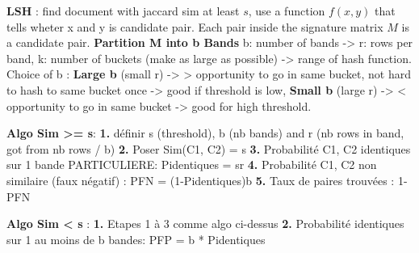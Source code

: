 \documentclass[9pt,a4paper]{report}
\begin{document}
\textbf{LSH} : find document with jaccard sim at least $s$, use a function $f(x,y)$ that tells wheter x and y is candidate pair. Each pair inside the signature matrix $M$ is a candidate pair. \textbf{Partition M into b Bands} b: number of bands -> r: rows per band, k: number of buckets (make as large as possible) -> range of hash function. Choice of b : \textbf{Large b} (small r) -> > opportunity to go in same bucket, not hard to hash to same bucket once -> good if threshold is low, \textbf{Small b} (large r) -> < opportunity to go in same bucket -> good for high threshold.

\textbf{Algo Sim >= s}: \textbf{1.} définir s (threshold), b (nb bands) and r (nb rows in band, got from nb rows / b)
\textbf{2.} Poser Sim(C1, C2) = s
\textbf{3.} Probabilité C1, C2 identiques sur 1 bande PARTICULIERE: Pidentiques = sr
\textbf{4.} Probabilité C1, C2 non similaire (faux négatif) : PFN = (1-Pidentiques)b
\textbf{5.} Taux de paires trouvées : 1-PFN

\textbf{Algo Sim < s} :
\textbf{1.} Etapes 1 à 3 comme algo ci-dessus
\textbf{2.} Probabilité identiques sur 1 au moins de b bandes: PFP = b *  Pidentiques
\end{document}
